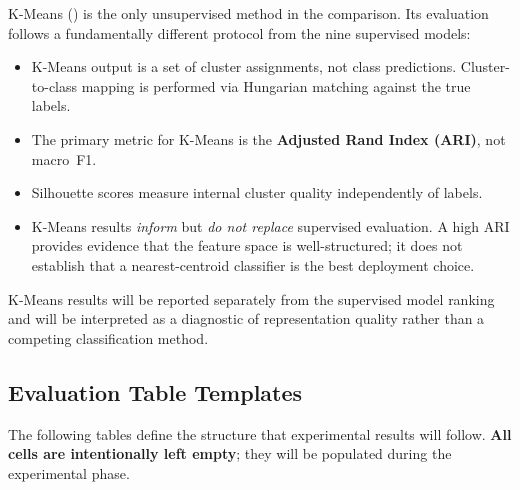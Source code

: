 K-Means () is the only unsupervised method in
the comparison.  Its evaluation follows a fundamentally different
protocol from the nine supervised models:
%
\begin{itemize}
  \item K-Means output is a set of cluster assignments, not class
        predictions.  Cluster-to-class mapping is performed via
        Hungarian matching against the true labels.
  \item The primary metric for K-Means is the \textbf{Adjusted Rand
        Index (ARI)}, not macro~F1.
  \item Silhouette scores measure internal cluster quality
        independently of labels.
  \item K-Means results \emph{inform} but \emph{do not replace}
        supervised evaluation.  A high ARI provides evidence that the
        feature space is well-structured; it does not establish that
        a nearest-centroid classifier is the best deployment choice.
\end{itemize}

K-Means results will be reported separately from the supervised model
ranking and will be interpreted as a diagnostic of representation
quality rather than a competing classification method.


\subsection{Evaluation Table Templates}
\label{subsec:eval_tables}

The following tables define the structure that experimental results
will follow.  \textbf{All cells are intentionally left empty}; they
will be populated during the experimental phase.

